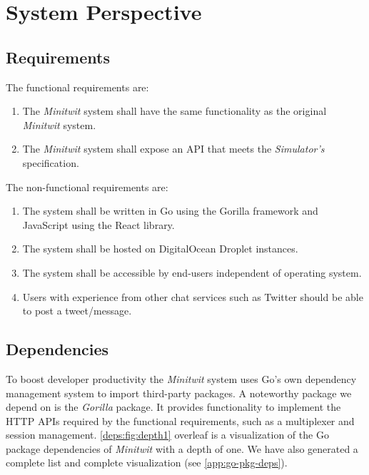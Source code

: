 \section{System Perspective}
\label{sec:sys_perspective}

\subsection{Requirements}
\label{sec:reqs}

The functional requirements are:
\begin{enumerate}
    \item The \textit{Minitwit} system shall have the same functionality as the original \textit{Minitwit} system.
    \item The \textit{Minitwit} system shall expose an API that meets the \textit{Simulator's} specification.
\end{enumerate}

The non-functional requirements are:
\begin{enumerate}
    \item The system shall be written in Go using the Gorilla framework and JavaScript using the React library.
    \item The system shall be hosted on DigitalOcean Droplet instances.
    \item The system shall be accessible by end-users independent of operating system.
    \item Users with experience from other chat services such as Twitter should be able to post a tweet/message.
\end{enumerate}



\subsection{Dependencies}
\label{sec:deps}
To boost developer productivity the \textit{Minitwit} system uses Go's own dependency management system to import third-party packages.
A noteworthy package we depend on is the \textit{Gorilla} package.
It provides functionality to implement the HTTP APIs required by the functional requirements, such as a multiplexer and session management. 
\autoref{deps:fig:depth1} overleaf is a visualization of the Go package dependencies of \textit{Minitwit} with a depth of one.
We have also generated a complete list and complete visualization (see \autoref{app:go-pkg-deps}).

